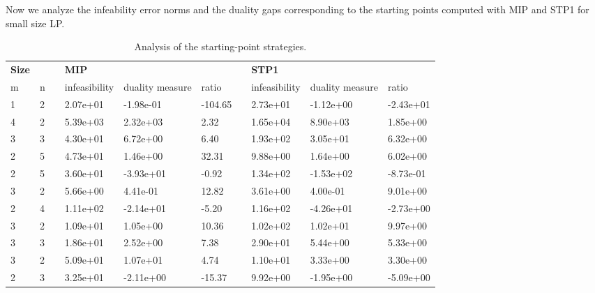 \documentclass[a4paper,10 pt,titlepage,twoside]{book}
\theoremstyle{plain}
\theoremstyle{definition}
\theoremstyle{remark}
\begin{document}
Now we analyze the infeability error norms and the duality gaps corresponding to the starting points computed with MIP and STP1 for small size LP.\\
\begin{table}[!h]\caption{\label{fig:STP1} Analysis of the starting-point strategies.}	
	\begin{tabular}{llllllllll}
		\hline
		\textbf{Size} &  &  & \textbf{MIP}&&  &  & \multicolumn{3}{l}{\textbf{      STP1}} \\ \cline{1-2} \cline{4-6} \cline{8-10} 
		m & n &  & infeasibility & duality measure & ratio &  & infeasibility & duality measure & ratio \\ \hline
		1 & 2 &  & 2.07e+01 & -1.98e-01 & -104.65 &  & 2.73e+01 & -1.12e+00 & -2.43e+01 \\
		4 & 2 &  & 5.39e+03 & 2.32e+03 & 2.32 &  & 1.65e+04 & 8.90e+03 & 1.85e+00 \\
		3 & 3 &  & 4.30e+01 & 6.72e+00 & 6.40 &  & 1.93e+02 & 3.05e+01 & 6.32e+00 \\
		2 & 5 &  & 4.73e+01 & 1.46e+00 & 32.31 &  & 9.88e+00 & 1.64e+00 & 6.02e+00 \\
		2 & 5 &  & 3.60e+01 & -3.93e+01 & -0.92 &  & 1.34e+02 & -1.53e+02 & -8.73e-01 \\
		3 & 2 &  & 5.66e+00 & 4.41e-01 & 12.82 &  & 3.61e+00 & 4.00e-01 & 9.01e+00 \\
		2 & 4 &  & 1.11e+02 & -2.14e+01 & -5.20 &  & 1.16e+02 & -4.26e+01 & -2.73e+00 \\
		3 & 2 &  & 1.09e+01 & 1.05e+00 & 10.36 &  & 1.02e+02 & 1.02e+01 & 9.97e+00 \\
		3 & 3 &  & 1.86e+01 & 2.52e+00 & 7.38 &  & 2.90e+01 & 5.44e+00 & 5.33e+00 \\
		3 & 2 &  & 5.09e+01 & 1.07e+01 & 4.74 &  & 1.10e+01 & 3.33e+00 & 3.30e+00 \\
		2 & 3 &  & 3.25e+01 & -2.11e+00 & -15.37 &  & 9.92e+00 & -1.95e+00 & -5.09e+00 \\

\end{tabular}
\end{table}
\end{document}
